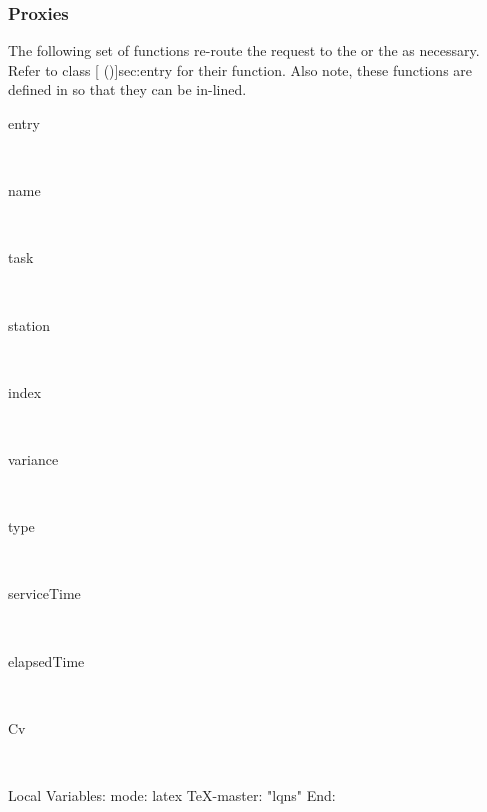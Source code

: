 \subsubsection{Proxies}

The following set of functions re-route the request to the
 or the
 as necessary.  Refer to class
[ (\Sec\Ref)]{sec:entry} for their function.  Also
note, these functions are defined in  so that they can
be in-lined.

\begin{description}
\item[entry] \texonly{---} \\

\item[name] \texonly{---} \\

\item[task] \texonly{---} \\

\item[station] \texonly{---} \\

\item[index] \texonly{---} \\

\item[variance] \texonly{---} \\

\item[type] \texonly{---} \\

\item[serviceTime] \texonly{---} \\

\item[elapsedTime] \texonly{---} \\

\item[Cv] \texonly{---} \\

\end{description}

\C Local Variables: 
\C mode: latex
\C TeX-master: "lqns"
\C End: 

